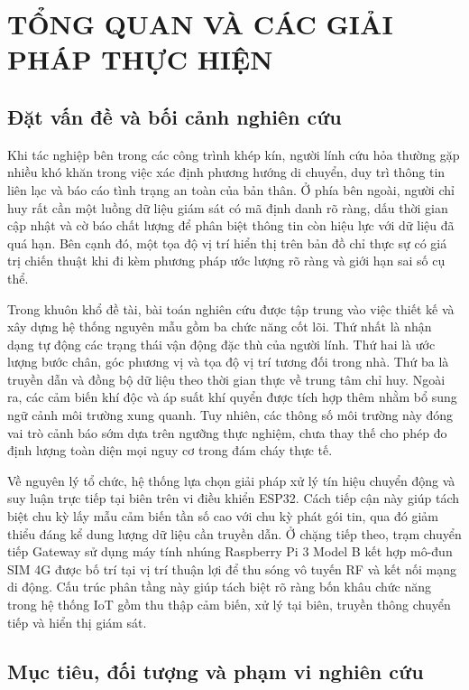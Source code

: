 \chapter{TỔNG QUAN VÀ CÁC GIẢI PHÁP THỰC HIỆN}\label{ch:tongquan}

\section{Đặt vấn đề và bối cảnh nghiên cứu}
Khi tác nghiệp bên trong các công trình khép kín, người lính cứu hỏa thường gặp nhiều khó khăn trong việc xác định phương hướng di chuyển, duy trì thông tin liên lạc và báo cáo tình trạng an toàn của bản thân. Ở phía bên ngoài, người chỉ huy rất cần một luồng dữ liệu giám sát có mã định danh rõ ràng, dấu thời gian cập nhật và cờ báo chất lượng để phân biệt thông tin còn hiệu lực với dữ liệu đã quá hạn. Bên cạnh đó, một tọa độ vị trí hiển thị trên bản đồ chỉ thực sự có giá trị chiến thuật khi đi kèm phương pháp ước lượng rõ ràng và giới hạn sai số cụ thể.

Trong khuôn khổ đề tài, bài toán nghiên cứu được tập trung vào việc thiết kế và xây dựng hệ thống nguyên mẫu gồm ba chức năng cốt lõi. Thứ nhất là nhận dạng tự động các trạng thái vận động đặc thù của người lính. Thứ hai là ước lượng bước chân, góc phương vị và tọa độ vị trí tương đối trong nhà. Thứ ba là truyền dẫn và đồng bộ dữ liệu theo thời gian thực về trung tâm chỉ huy. Ngoài ra, các cảm biến khí độc và áp suất khí quyển được tích hợp thêm nhằm bổ sung ngữ cảnh môi trường xung quanh. Tuy nhiên, các thông số môi trường này đóng vai trò cảnh báo sớm dựa trên ngưỡng thực nghiệm, chưa thay thế cho phép đo định lượng toàn diện mọi nguy cơ trong đám cháy thực tế.

Về nguyên lý tổ chức, hệ thống lựa chọn giải pháp xử lý tín hiệu chuyển động và suy luận trực tiếp tại biên trên vi điều khiển ESP32. Cách tiếp cận này giúp tách biệt chu kỳ lấy mẫu cảm biến tần số cao với chu kỳ phát gói tin, qua đó giảm thiểu đáng kể dung lượng dữ liệu cần truyền dẫn. Ở chặng tiếp theo, trạm chuyển tiếp Gateway sử dụng máy tính nhúng Raspberry Pi 3 Model B kết hợp mô-đun SIM 4G được bố trí tại vị trí thuận lợi để thu sóng vô tuyến RF và kết nối mạng di động. Cấu trúc phân tầng này giúp tách biệt rõ ràng bốn khâu chức năng trong hệ thống IoT gồm thu thập cảm biến, xử lý tại biên, truyền thông chuyển tiếp và hiển thị giám sát.

\section{Mục tiêu, đối tượng và phạm vi nghiên cứu}\label{sec:scope}
